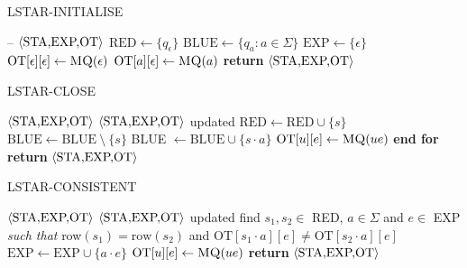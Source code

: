 \begin{algorithm}
\caption{LSTAR-INITIALISE}\label{alg:lstar-initialise}
\begin{algorithmic}[1]
\Statex
\Input --
\Output $\Braket{\text{STA,EXP,OT}}$
\State $\text{RED} \gets \{q_\epsilon\}$
\State $\text{BLUE} \gets \{q_a : a \in \Sigma\}$
\State $\text{EXP} \gets \{\epsilon\}$
\State $\text{OT}[\epsilon][\epsilon] \gets \Call{MQ}{\epsilon}$
\vspace{1mm}
 $\text{OT}[a][\epsilon] \gets \Call{MQ}{a}$
\EndFor
\State \textbf{return} $\Braket{\text{STA,EXP,OT}}$
\end{algorithmic}
\end{algorithm}

\begin{algorithm}
\caption{LSTAR-CLOSE}\label{alg:lstar-close}
\begin{algorithmic}[1]
\Statex
\Input $\Braket{\text{STA,EXP,OT}}$
\Output $\Braket{\text{STA,EXP,OT}}$ updated
     \State $\text{RED} \gets \text{RED} \cup \{s\}$
     \State $\text{BLUE} \gets \text{BLUE} \: \setminus \: \{s\}$
      BLUE $\gets \text{BLUE} \cup \{s\cdot a\}$
     \EndFor
      $\text{OT}[u][e] \gets \Call{MQ}{ue}$
\EndFor
\EndFor
\State \textbf{end for}
\State \textbf{return} $\Braket{\text{STA,EXP,OT}}$
\end{algorithmic}
\end{algorithm}

\begin{algorithm}
\caption{LSTAR-CONSISTENT}\label{alg:lstar-consistent}
\begin{algorithmic}[1]
\Statex
\Input $\Braket{\text{STA,EXP,OT}}$
\Output $\Braket{\text{STA,EXP,OT}}$ updated
\State find $s_1, s_2 \in$ RED, $a \in \Sigma$ and $e \in$ EXP \textit{such that} row$(s_1) = \text{row}(s_2)$ and
\State $\text{OT}[s_1 \cdot a][e] \ne \text{OT}[s_2 \cdot a][e]$
\State $\text{EXP} \gets \text{EXP} \cup \{a \cdot e\}$ 
 $\text{OT}[u][e] \gets \Call{MQ}{ue}$
\EndFor
\State \textbf{return} $\Braket{\text{STA,EXP,OT}}$
\end{algorithmic}
\end{algorithm}

